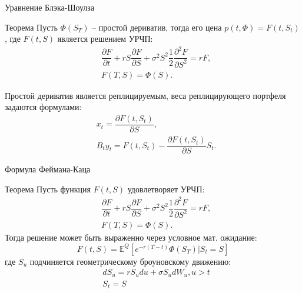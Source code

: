 \documentclass[aspectratio=169]{beamer}
\begin{document}
\begin{frame}{Уравнение Блэка-Шоулза}
    \begin{block}{Теорема}
        Пусть $\Phi(S_T)$ -- простой дериватив, тогда его цена $p(t, \Phi) = F(t, S_t)$, где $F(t, S)$ является решением УРЧП:
        \begin{align*}
            &\dfrac{\partial F}{\partial t} + r S \dfrac{\partial F}{\partial S} + \sigma^2 S^2 \dfrac{1}{2}\dfrac{\partial^2 F}{\partial S^2} = r F ,\\
            &F(T, S) = \Phi(S).
        \end{align*}
    \end{block}
    Простой дериватив является реплицируемым, веса реплицирующего портфеля задаются формулами:
    \begin{align*}
        &x_t = \dfrac{\partial F(t, S_t)}{\partial S},\\
        &B_t y_t = F(t, S_t) - \dfrac{\partial F(t, S_t)}{\partial S} S_t.
    \end{align*}
\end{frame}

\begin{frame}{Формула Феймана-Каца}
    \begin{block}{Теорема}
        Пусть функция $F(t, S)$ удовлетворяет УРЧП:
        \begin{align*}
            &\dfrac{\partial F}{\partial t} + r S \dfrac{\partial F}{\partial S} + \sigma^2 S^2 \dfrac{1}{2}\dfrac{\partial^2 F}{\partial S^2} = r F ,\\
            &F(T, S) = \Phi(S).
        \end{align*}
        Тогда решение может быть выраженно через условное мат. ожидание:
        $$
            F(t, S) = \mathbb{E}^Q \left[ e^{-r(T-t)} \Phi(S_T) | S_t = S\right]
        $$где $S_u$ подчиняется геометрическому броуновскому движению:
        \begin{align*}
            &dS_u = r S_u du + \sigma S_u dW_u, u > t \\
            &S_t = S
        \end{align*}
    \end{block}
\end{frame}
\end{document}
